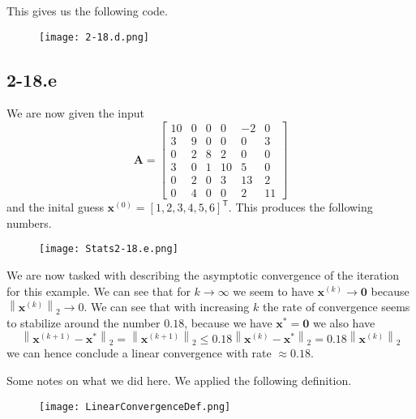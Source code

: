 \documentclass{article}
\newcommand\xkn{\mathbf{x}^{\left(k+1\right)}}
\newcommand\xk{\mathbf{x}^{\left(k\right)}}
\newcommand\tr{\mathsf{T}}
\begin{document}
\noindent This gives us the following code.

\begin{figure}[!hbt]
    \centering
\texttt{[image: 2-18.d.png]}
\end{figure}

\pagebreak

\subsection*{2-18.e}
We are now given the input
\begin{equation*}
    \mathbf{A} = 
    \begin{bmatrix}
        10 & 0 & 0 & 0 & -2 & 0 \\
        3 & 9 & 0 & 0 & 0 & 3 \\
        0 & 2 & 8 & 2 & 0 & 0 \\
        3 & 0 & 1 & 10 & 5 & 0 \\
        0 & 2 & 0 & 3 & 13 & 2 \\
        0 & 4 & 0 & 0 & 2 & 11
    \end{bmatrix}
\end{equation*}
and the inital guess $\mathbf{x}^{\left(0\right)} = \left[1,2,3,4,5,6\right]^{\tr}$. This produces the following numbers.
\begin{figure}[!hbt]
    \centering
\texttt{[image: Stats2-18.e.png]}
\end{figure}

\noindent We are now tasked with describing the asymptotic convergence of the iteration for this example. We can see that for $k \to \infty$ we seem to have $\xk \to \mathbf{0}$ because $\left\lVert \xk \right\rVert_{2} \to 0$. We can see that with increasing $k$ the rate of convergence seems to stabilize around the number $0.18$, because we have $\mathbf{x}^{*} = \mathbf{0}$ we also have
\begin{equation*}
    \left\lVert \xkn - \mathbf{x}^{*} \right\rVert_{2} = \left\lVert \xkn \right\rVert_{2} \leq 0.18 \left\lVert \xk - \mathbf{x}^{*} \right\rVert_{2} = 0.18\left\lVert \xk \right\rVert_{2}
\end{equation*}
we can hence conclude a linear convergence with rate $\approx 0.18$. 

\pagebreak

\noindent Some notes on what we did here. We applied the following definition.
\begin{figure}[!hbt]
    \centering
\texttt{[image: LinearConvergenceDef.png]}
\end{figure}
\end{document}
